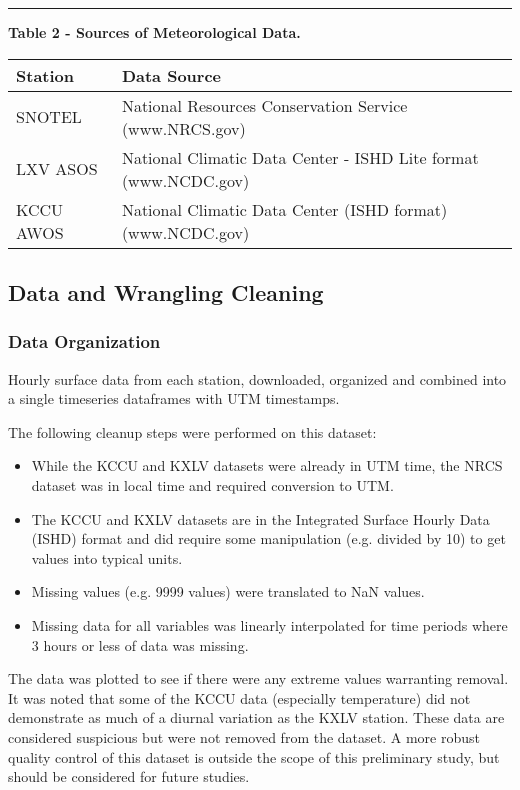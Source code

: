 \documentclass[11pt]{article}
\providecommand{\tightlist}{%
      \setlength{\itemsep}{0pt}\setlength{\parskip}{0pt}}
\begin{document}
\begin{center}\rule{0.5\linewidth}{\linethickness}\end{center}

\textbf{Table 2 - Sources of Meteorological Data.}

\begin{longtable}[]{@{}ll@{}}
\toprule
Station & Data Source\tabularnewline
\midrule
\endhead
SNOTEL & National Resources Conservation Service
(www.NRCS.gov)\tabularnewline
LXV ASOS & National Climatic Data Center - ISHD Lite format
(www.NCDC.gov)\tabularnewline
KCCU AWOS & National Climatic Data Center (ISHD format)
(www.NCDC.gov)\tabularnewline
\bottomrule
\end{longtable}

\subsection{Data and Wrangling
Cleaning}\label{data-and-wrangling-cleaning}

\subsubsection{Data Organization}\label{data-organization}

Hourly surface data from each station, downloaded, organized and
combined into a single timeseries dataframes with UTM timestamps.

The following cleanup steps were performed on this dataset:

\begin{itemize}
\tightlist
\item
  While the KCCU and KXLV datasets were already in UTM time, the NRCS
  dataset was in local time and required conversion to UTM.\\
\item
  The KCCU and KXLV datasets are in the Integrated Surface Hourly Data
  (ISHD) format and did require some manipulation (e.g. divided by 10)
  to get values into typical units.
\item
  Missing values (e.g. 9999 values) were translated to NaN values.
\item
  Missing data for all variables was linearly interpolated for time
  periods where 3 hours or less of data was missing.
\end{itemize}

The data was plotted to see if there were any extreme values warranting
removal. It was noted that some of the KCCU data (especially
temperature) did not demonstrate as much of a diurnal variation as the
KXLV station. These data are considered suspicious but were not removed
from the dataset. A more robust quality control of this dataset is
outside the scope of this preliminary study, but should be considered
for future studies.
\end{document}
